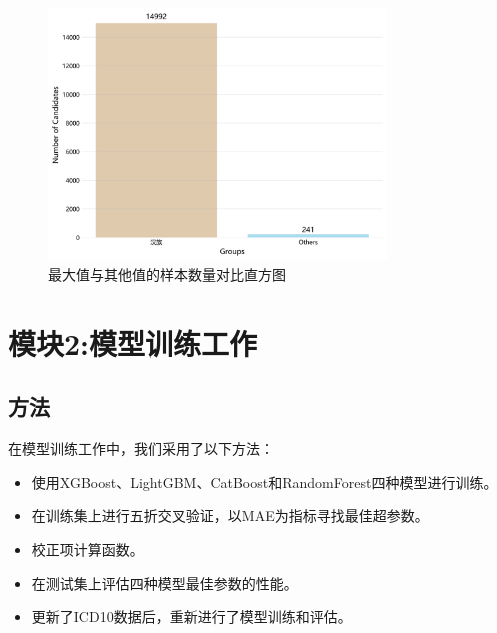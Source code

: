 \documentclass[UTF8]{report}
\theoremstyle{MyLineTheoremStyle} %
\theoremstyle{MyBlockTheoremStyle} %
\theoremstyle{MySubsubsectionStyle} %
\begin{document}
\begin{figure}[H]
    \centering
    \includegraphics[width=0.8\textwidth]{assets/max_vs_others_histogram_ultra_high.png}
    \caption{最大值与其他值的样本数量对比直方图}
    \label{fig:max_vs_others_histogram_ultra_high}
\end{figure}


\section{模块2:模型训练工作}

\subsection*{方法}
在模型训练工作中，我们采用了以下方法：
\begin{itemize}
    \item 使用XGBoost、LightGBM、CatBoost和RandomForest四种模型进行训练。
    \item 在训练集上进行五折交叉验证，以MAE为指标寻找最佳超参数。
    \item 校正项计算函数。
    \item 在测试集上评估四种模型最佳参数的性能。
    \item 更新了ICD10数据后，重新进行了模型训练和评估。
\end{itemize}
\end{document}
